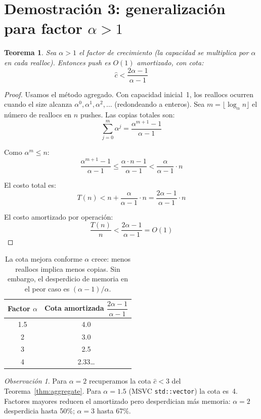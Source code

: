 \documentclass[11pt, letterpaper]{article}
\theoremstyle{definition}
\theoremstyle{plain}
\newtheorem{theorem}{Teorema}[section]
\theoremstyle{remark}
\newtheorem{remark}{Observación}[section]
\begin{document}
\section{Demostración 3: generalización para factor
  \texorpdfstring{$\alpha > 1$}{α > 1}}

\begin{theorem}\label{thm:alpha}
Sea $\alpha > 1$ el factor de crecimiento (la capacidad se multiplica
por $\alpha$ en cada realloc). Entonces push es $O(1)$ amortizado, con
cota:
\[
  \hat{c} < \frac{2\alpha - 1}{\alpha - 1}
\]
\end{theorem}

\begin{proof}
Usamos el método agregado. Con capacidad inicial~1, los reallocs ocurren
cuando el size alcanza $\alpha^0, \alpha^1, \alpha^2, \ldots$
(redondeando a enteros). Sea $m = \lfloor \log_\alpha n \rfloor$ el
número de reallocs en $n$ pushes. Las copias totales son:
\[
  \sum_{j=0}^{m} \alpha^j
  = \frac{\alpha^{m+1} - 1}{\alpha - 1}
\]

Como $\alpha^m \leq n$:
\[
  \frac{\alpha^{m+1} - 1}{\alpha - 1}
  \leq \frac{\alpha \cdot n - 1}{\alpha - 1}
  < \frac{\alpha}{\alpha - 1} \cdot n
\]

El costo total es:
\[
  T(n) < n + \frac{\alpha}{\alpha - 1} \cdot n
       = \frac{2\alpha - 1}{\alpha - 1} \cdot n
\]

El costo amortizado por operación:
\[
  \frac{T(n)}{n} < \frac{2\alpha - 1}{\alpha - 1} = O(1)
\]
\end{proof}

\begin{table}[h]
\centering
\begin{tabular}{cc}
\toprule
Factor $\alpha$ & Cota amortizada $\dfrac{2\alpha - 1}{\alpha - 1}$ \\
\midrule
1.5 & 4.0   \\
2   & 3.0   \\
3   & 2.5   \\
4   & 2.33\ldots \\
\bottomrule
\end{tabular}
\caption{La cota mejora conforme $\alpha$ crece: menos reallocs implica
menos copias. Sin embargo, el desperdicio de memoria en el peor caso es
$(\alpha - 1)/\alpha$.}
\end{table}

\begin{remark}
Para $\alpha = 2$ recuperamos la cota $\hat{c} < 3$ del
Teorema~\ref{thm:aggregate}. Para $\alpha = 1.5$ (MSVC
\texttt{std::vector}) la cota es~4. Factores mayores reducen el
amortizado pero desperdician más memoria: $\alpha = 2$ desperdicia
hasta 50\%; $\alpha = 3$ hasta 67\%.
\end{remark}
\end{document}
